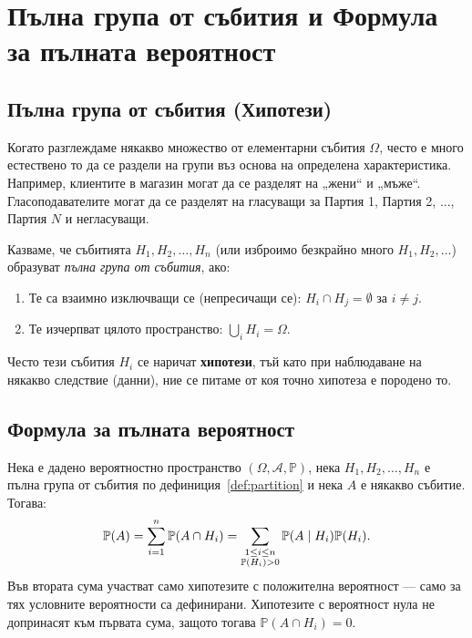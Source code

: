 \section{Пълна група от събития и Формула за пълната вероятност}

\subsection{Пълна група от събития (Хипотези)}

Когато разглеждаме някакво множество от елементарни събития $\Omega$, често е много естествено то да се раздели на групи въз основа на определена характеристика. Например, клиентите в магазин могат да се разделят на „жени“ и „мъже“. Гласоподавателите могат да се разделят на гласуващи за Партия 1, Партия 2, ..., Партия $N$ и негласуващи.

\begin{defn}\label{def:partition}
Казваме, че събитията $H_1, H_2, \dots, H_n$ (или изброимо безкрайно много $H_1, H_2, \dots$) образуват \emph{пълна група от събития}, ако:
\begin{enumerate}
    \item Те са взаимно изключващи се (непресичащи се): $H_i \cap H_j = \emptyset$ за $i \neq j$.
    \item Те изчерпват цялото пространство: $\bigcup_{i} H_i = \Omega$.
\end{enumerate}
\end{defn}

Често тези събития $H_i$ се наричат \textbf{хипотези}, тъй като при наблюдаване на някакво следствие (данни), ние се питаме от коя точно хипотеза е породено то.

\subsection{Формула за пълната вероятност}

\begin{keythm}\label{thm:total-probability}
Нека е дадено вероятностно пространство $(\Omega, \mathcal{A}, \mathbb{P})$, нека $H_1, H_2, \dots, H_n$ е пълна група от събития по дефиниция~\ref{def:partition} и нека $A$ е някакво събитие. Тогава:
\[
\mathbb{P}(A) = \sum_{i=1}^n \mathbb{P}(A \cap H_i)
= \sum_{\substack{1\le i\le n\\ \mathbb{P}(H_i)>0}}
\mathbb{P}(A \mid H_i)\mathbb{P}(H_i) .
\]
Във втората сума участват само хипотезите с положителна вероятност — само за тях
условните вероятности са дефинирани. Хипотезите с вероятност нула не допринасят към
първата сума, защото тогава $\mathbb{P}(A\cap H_i)=0$.
\end{keythm}

